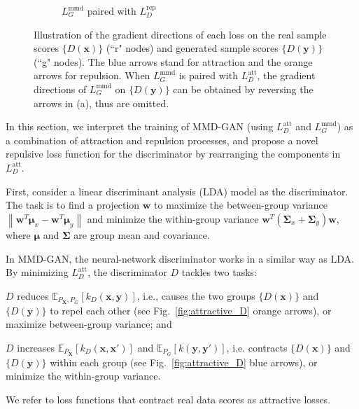 \documentclass{article} %
\theoremstyle{plain}
\newtheorem*{proposition 1*}{Proposition 1}
\newcommand\norm[1]{\left\lVert#1\right\rVert}
\newcommand{\set}[1]{\mathbb{#1}}  %
\newcommand{\rdv}[1]{\mathbf{#1}}  %
\begin{document}
\begin{figure}[tb]
\begin{subfigure}[t]{0.26\linewidth}
		\caption{\(L_{G}^{\text{mmd}}\) paired with \(L_{D}^{\text{rep}}\)\label{fig:repulsive_G}}
	\end{subfigure}
	\caption{Illustration of the gradient directions of each loss on the real sample scores \(\{D(\bm{x})\}\) (``r" nodes) and generated sample scores \(\{D(\bm{y})\}\) (``g" nodes). The blue arrows stand for attraction and the orange arrows for repulsion. When \(L_{G}^{\text{mmd}}\) is paired with \(L_D^{\text{att}}\), the gradient directions of \(L_{G}^{\text{mmd}}\) on \(\{D(\bm{y})\}\) can be obtained by reversing the arrows in (a), thus are omitted.}  
	\label{fig:att_vs_rep}
\end{figure}

In this section, we interpret the training of MMD-GAN (using \(L_D^{\text{att}}\) and \(L_{G}^{\text{mmd}}\)) as a combination of attraction and repulsion processes, and propose a novel repulsive loss function for the discriminator by rearranging the components in \(L_D^{\text{att}}\).

First, consider a linear discriminant analysis (LDA) model as the discriminator. The task is to find a projection \(\bm{w}\) to maximize the between-group variance \(\norm{\bm{w}^T\bm{\mu}_x-\bm{w}^T\bm{\mu}_y}\) and minimize the within-group variance \(\bm{w}^T(\bm{\Sigma}_x+\bm{\Sigma}_y)\bm{w}\), where \(\bm{\mu}\) and \(\bm{\Sigma}\) are group mean and covariance. 

In MMD-GAN, the neural-network discriminator works in a similar way as LDA. By minimizing \(L_D^{\text{att}}\), the discriminator \(D\) tackles two tasks:
\begin{enumerate*}[label=\arabic*)]
	\item \(D\) reduces \(\set{E}_{P_{\rdv{X}},P_{G}}[k_D(\bm{x},\bm{y})]\), i.e., causes the two groups \(\{D(\bm{x})\}\) and \(\{D(\bm{y})\}\) to repel each other (see Fig.~\ref{fig:attractive_D} orange arrows), or maximize between-group variance; and
	\item \(D\) increases \(\set{E}_{P_{\rdv{X}}}[k_D(\bm{x},\bm{x}')]\) and \(\set{E}_{P_G}[k(\bm{y},\bm{y}')]\), i.e. contracts \(\{D(\bm{x})\}\) and \(\{D(\bm{y})\}\) within each group (see Fig.~\ref{fig:attractive_D} blue arrows), or minimize the within-group variance.
\end{enumerate*}
We refer to loss functions that contract real data scores as attractive losses.  
\end{document}
